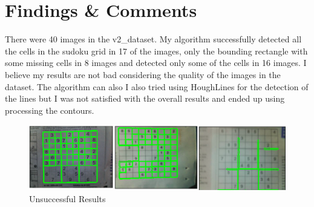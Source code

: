 \section*{Findings \& Comments}
There were 40 images in the v2\_dataset. My algorithm successfully detected all the cells in the sudoku grid in 17 of the images, only the bounding rectangle with some missing cells in 8 images and detected only some of the cells in 16 images. I believe my results are not bad considering the quality of the images in the dataset. The algorithm can also I also tried using HoughLines for the detection of the lines but I was not satisfied with the overall results and ended up using processing the contours.
\begin{figure}[H]
    \centering
    \includegraphics[width=\textwidth]{images/bad_images.png}
    \caption{Unsuccessful Results}
    \setlength{\belowcaptionskip}{-20pt}
    \setlength{\abovecaptionskip}{-20pt}
\end{figure}

